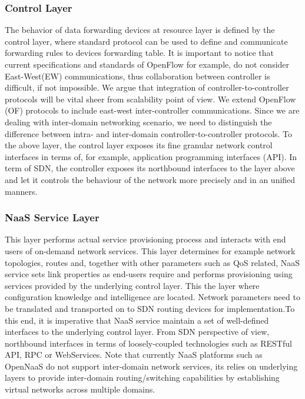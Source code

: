 \subsubsection{Control Layer} The behavior of data forwarding devices at
resource layer is defined by the control layer, where standard protocol can be
used to define and communicate forwarding rules to devices forwarding table.
It is important to notice that current specifications and standards of OpenFlow
for example, do not consider East-West(EW) communications, thus collaboration
between controller is difficult, if not impossible. We argue that integration
of controller-to-controller protocols will be vital sheer from scalability
point of view. We extend OpenFlow (OF) protocols to include east-west
inter-controller communications. Since we are dealing with inter-domain
networking scenario, we need to distinguish the difference between intra- and
inter-domain controller-to-controller protocols. To the above layer, the
control layer exposes its fine granular network control interfaces in terms of,
for example, application programming interfaces (API). In term of SDN, the
controller exposes its northbound interfaces to the layer above and let it
controls the behaviour of the network more precisely and in an unified
manners.

\subsubsection{NaaS Service Layer} This layer performs actual service
provisioning process and interacts with end users of on-demand network
services. This layer determines for example  network topologies, routes and,
together with other parameters such as QoS related, NaaS service sets link
properties as end-users require and performs provisioning using services
provided by the underlying control layer. This the layer where configuration
knowledge and intelligence are located. Network parameters need to be
translated and transported on to SDN routing devices for implementation.To this
end, it is imperative that NaaS service maintain a set of well-defined
interfaces to the underlying control layer. From SDN perspective of view,
northbound interfaces in terms of loosely-coupled technologies such as RESTful
API, RPC or WebServices. Note that currently NaaS platforms such as OpenNaaS do
not support inter-domain network services, its relies on underlying layers to
provide inter-domain routing/switching capabilities by establishing virtual
networks across multiple domains.


